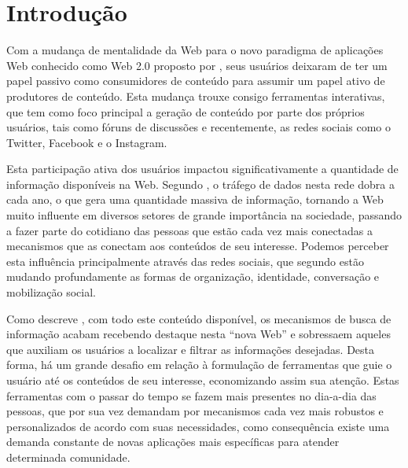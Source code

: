 \section{\esp Introdução}
Com a mudança de mentalidade da Web para o novo paradigma de aplicações Web conhecido como Web 2.0 proposto por \cite{web20Proposta}, seus 
usuários deixaram de ter um papel passivo como consumidores de conteúdo para assumir um papel ativo de produtores de conteúdo. Esta mudança 
trouxe consigo ferramentas interativas, que tem como foco principal a geração de conteúdo por parte dos próprios usuários, tais como fóruns 
de discussões e recentemente, as redes sociais como o Twitter, Facebook e o Instagram.

Esta participação ativa dos usuários impactou significativamente a quantidade de informação disponíveis na Web. Segundo \cite{artigo01}, 
o tráfego de dados nesta rede dobra a cada ano, o que gera uma quantidade massiva de informação, tornando a Web muito influente em diversos 
setores de grande importância na sociedade, passando a fazer parte do cotidiano das pessoas que estão cada vez mais conectadas a mecanismos que
as  conectam aos conteúdos de seu interesse. Podemos perceber esta influência principalmente através das redes sociais, que segundo 
\cite{redesSociais01} estão mudando profundamente as formas de organização, identidade, conversação e mobilização social.

Como descreve \cite{deitelAjax}, com todo este conteúdo disponível, os mecanismos de busca de informação 
acabam recebendo destaque nesta ``nova Web'' e sobressaem aqueles que auxiliam os usuários  a localizar e filtrar 
as informações desejadas. Desta forma, há um grande desafio em relação à formulação de ferramentas que guie o usuário até os conteúdos de seu 
interesse, economizando assim sua atenção. Estas ferramentas com o passar do tempo se fazem mais presentes no dia-a-dia das pessoas, 
que por sua vez demandam por mecanismos cada vez mais robustos e personalizados de acordo com suas necessidades, como consequência existe 
uma demanda constante de novas aplicações mais específicas para atender determinada comunidade.

